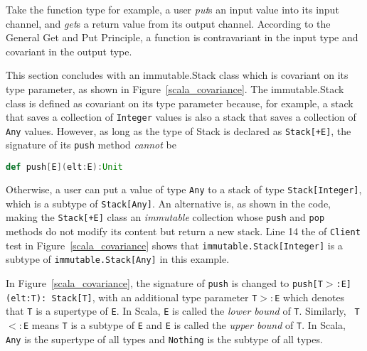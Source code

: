 Take the function type for example, a user {\it put}s an input value into 
its input channel, and {\it get}s a return value from its output channel.  
According to the General Get and Put Principle, a function is contravariant in 
the input type and covariant in the output type.

This section concludes with an immutable.Stack class which is covariant on its type 
parameter, as shown in Figure~\ref{scala_covariance}.  The immutable.Stack class 
is defined as covariant on  its type parameter because, for example, a stack 
that saves a collection of {\tt Integer} values is also a stack that saves a collection of {\tt Any} 
values.  However, as long as the type of Stack is declared as {\tt Stack[+E]}, the 
signature of its {\tt push} method {\it cannot} be
  \begin{lstlisting}[language=scala, escapechar=?]
  def push[E](elt:E):Unit
  \end{lstlisting}
Otherwise, a user can put a value of type {\tt Any}  to a stack of type {\tt Stack[Integer]},
which is a subtype of {\tt Stack[Any]}.  An alternative is, as shown 
in the code, making the {\tt Stack[+E]} class an {\it immutable} collection 
whose {\tt push} and {\tt pop} methods do not modify its content but return a 
new stack.   Line 14 the of {\tt Client} test in Figure~\ref{scala_covariance}
shows that  {\tt immutable.Stack[Integer]} is a subtype of {\tt immutable.Stack[Any]} in this example.

In Figure~\ref{scala_covariance}, the signature of 
{\tt push} is changed to {\tt push[T$>$:E](elt:T): Stack[T]}, with an additional 
type parameter {\tt T$>:$E} which denotes that {\tt T} is a supertype of {\tt E}. 
In Scala, {\tt E} is called the {\it lower bound} of {\tt T}.  Similarly, {\tt 
T$<:$E} means {\tt T} is a subtype of {\tt E} and {\tt E} is called the {\it 
upper bound} of {\tt T}.  In Scala, {\tt Any} is the supertype of all types 
and {\tt Nothing} is the subtype of all types.


\begin{comment}
The final code example of this section, given in Figure 
\ref{scala_covariance}, provides a working library in which the {\tt Stack} 
trait is covariant on its type parameter.  Different from Stacks in previous 
examples, the new stack is {\it immutable} in the sense that its {\tt push} and 
{\tt pop} methods do not modify its content but return a new stack.
\end{comment}



